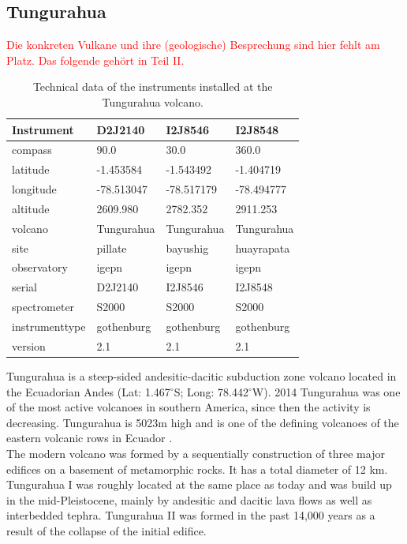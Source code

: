 \documentclass  [
  paper    = a4,
  BCOR     = 10mm,
  twoside,
  fontsize = 12pt,
  fleqn,
  toc      = bibnumbered,
  toc      = listofnumbered,
  numbers  = noendperiod,
  headings = normal,
  listof   = leveldown,
  version  = 3.03
]                                       {scrreprt}
\begin{document}
	\subsection*{Tungurahua \label{Tung}}\textcolor{red}{Die konkreten Vulkane und ihre (geologische) Besprechung sind hier fehlt am Platz. Das folgende gehört in Teil II.}
	\begin{table}
		\centering
		\begin{tabular}{|p{4cm}|p{3cm}|p{3cm}|p{3cm}|}
			Instrument	&D2J2140&I2J8546& I2J8548\\
			\toprule
			compass&90.0	&	30.0	&	360.0	\\
			latitude&-1.453584	&	-1.543492	&-1.404719	\\
			longitude&-78.513047	&-78.517179	&	-78.494777	\\
			altitude&2609.980	&	2782.352	&	2911.253	\\
			volcano&Tungurahua	&Tungurahua	&	Tungurahua	\\
			site&pillate	&	bayushig	&	huayrapata	\\
			observatory&igepn	&	igepn	&igepn	\\
			serial&D2J2140	&	I2J8546	&	I2J8548	\\
			spectrometer&S2000	&	S2000	&S2000	\\
			instrumenttype&gothenburg	&gothenburg	&gothenburg	\\
			version&2.1	&2.1	&	2.1	\\
			\bottomrule
		\end{tabular}
		\caption{Technical data of the instruments installed at the Tungurahua volcano.}
		\label{tab:TInstruments}
	\end{table}
	Tungurahua is a steep-sided andesitic-dacitic subduction zone volcano located in the Ecuadorian Andes (Lat: 1.467$^{\circ}$S; Long: 78.442$^{\circ}$W). 2014 Tungurahua was one of the most active volcanoes in southern America, since then the activity is decreasing. Tungurahua is 5023m high and is one of the defining volcanoes of the eastern volcanic rows in Ecuador \citep{hall1999tungurahua}.
	\\
	The modern volcano was formed by a sequentially construction of three major edifices on a basement of metamorphic rocks. It has a total diameter of 12 km. Tungurahua I was roughly located at the same place as today and was build up in the mid-Pleistocene, mainly by andesitic and dacitic lava flows as well as interbedded tephra. Tungurahua II was formed in the past 14,000 years as a result of the collapse of the initial edifice.\\
\end{document}
